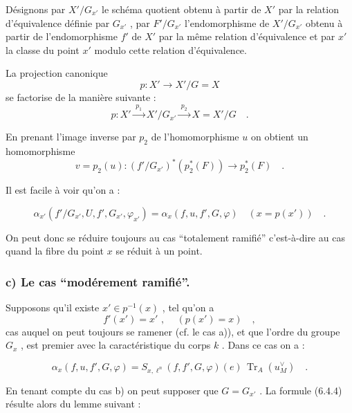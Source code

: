 \documentclass[11pt]{article}
\providecommand{\Tr}{\operatorname{Tr}}
\providecommand{\Tr}{\operatorname{Tr}}
\providecommand{\Tr}{\operatorname{Tr}}
\providecommand{\Tr}{\operatorname{Tr}}
\providecommand{\Tr}{\operatorname{Tr}}
\begin{document}
Désignons par $X'/G_{x'}$ le schéma quotient obtenu à partir de $X'$ par la relation d'équivalence définie par $G_{x'}$ , par $F'/G_{x'}$ l'endomorphisme de $X'/G_{x'}$ obtenu à partir de l'endomorphisme $f'$ de $X'$ par la même relation d'équivalence et par $x'$ la classe du point $x'$ modulo cette relation d'équivalence.%

La
projection canonique
\[
p : X' \longrightarrow X'/G = X
\]
se factorise de la manière suivante :
\[
p : X' \xrightarrow{\;p_1\;} X'/G_{x'} \xrightarrow{\;p_2\;} X = X'/G \quad .
\]

En prenant l'image inverse par $p_2$ de l'homomorphisme $u$ on obtient un homomorphisme
\[
v = p_2(u) : (f'/G_{x'})^*(p_2^*(F)) \longrightarrow p_2^*(F) \quad .
\]

Il est facile à voir qu'on a :

\begin{equation}\tag{6.4.3}
\alpha_{x'}(f'/G_{x'}, U, f', G_{x'}, \varphi_{x'}) = \alpha_x(f,u, f', G, \varphi) \quad (x = p(x')) \quad .
\end{equation}

On peut donc se réduire toujours au cas ``totalement ramifié'' c'est-à-dire au cas quand la fibre du point $x$ se réduit à un point.

\subsubsection*{c) Le cas ``modérement ramifié''.} Supposons qu'il existe $x' \in p^{-1}(x)$ , tel qu'on a
\[
f'(x') = x' \text{ , } \quad (p(x') = x) \quad ,
\]
cas auquel on peut toujours se ramener (cf. le cas a)), et que l'ordre du groupe $G_x$ , est premier avec la caractéristique du corps $k$ . Dans ce cas on a :

\begin{equation}\tag{6.4.4}
\alpha_x(f,u, f', G, \varphi) = S_{x,\ell^n}(f, f', G, \varphi)(e) \, \Tr_A(u_M^\vee) \quad .
\end{equation}

En tenant compte du cas b) on peut supposer que $G = G_{x'}$ . La formule (6.4.4) résulte alors du lemme suivant :

\end{document}

